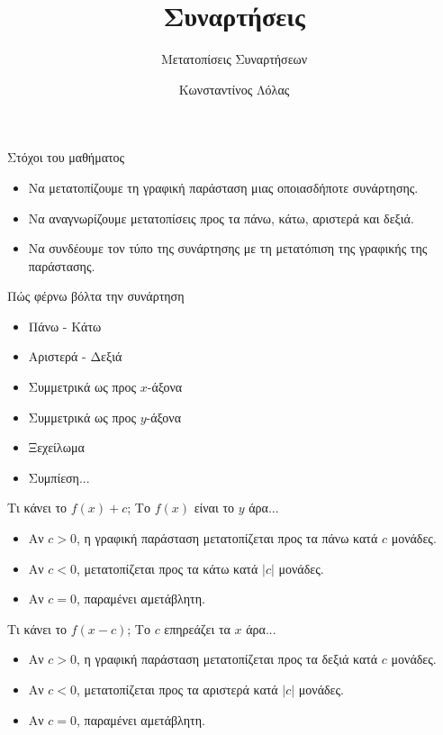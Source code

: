\documentclass{presentation}
\title{Συναρτήσεις}
\subtitle{Μετατοπίσεις Συναρτήσεων}
\author[Λόλας]{Κωνσταντίνος Λόλας }
\begin{document}
\begin{frame}
  \titlepage\end{frame}

\begin{frame}{Στόχοι του μαθήματος}
  \begin{itemize}[<+->]
    \item Να μετατοπίζουμε τη γραφική παράσταση μιας οποιασδήποτε συνάρτησης.
    \item Να αναγνωρίζουμε μετατοπίσεις προς τα πάνω, κάτω, αριστερά και δεξιά.
    \item Να συνδέουμε τον τύπο της συνάρτησης με τη μετατόπιση της γραφικής της παράστασης.
  \end{itemize}
\end{frame}

\begin{frame}{Πώς φέρνω βόλτα την συνάρτηση}
  \begin{itemize}[<+->]
    \item Πάνω - Κάτω
    \item Αριστερά - Δεξιά
    \item Συμμετρικά ως προς $x$-άξονα
    \item Συμμετρικά ως προς $y$-άξονα
    \item Ξεχείλωμα
    \item Συμπίεση...
  \end{itemize}
\end{frame}

\begin{frame}{Τι κάνει το $f(x)+c$;}
  Το $f(x)$ είναι το $y$ άρα...

  \begin{itemize}[<+->]
    \item<2-> Αν $c>0$, η γραφική παράσταση μετατοπίζεται προς τα πάνω κατά $c$ μονάδες.
    \item<3-> Αν $c<0$, μετατοπίζεται προς τα κάτω κατά $|c|$ μονάδες.
    \item<4-> Αν $c=0$, παραμένει αμετάβλητη.
  \end{itemize}
\end{frame}

\begin{frame}{Τι κάνει το $f(x-c)$;}
  Το $c$ επηρεάζει τα $x$ άρα...

  \begin{itemize}[<+->]
    \item<2-> Αν $c>0$, η γραφική παράσταση μετατοπίζεται προς τα δεξιά κατά $c$ μονάδες.
    \item<3-> Αν $c<0$, μετατοπίζεται προς τα αριστερά κατά $|c|$ μονάδες.
    \item<4-> Αν $c=0$, παραμένει αμετάβλητη.
  \end{itemize}
\end{frame}
\end{document}

